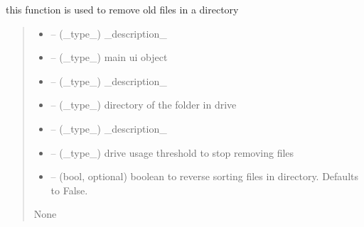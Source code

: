 \documentclass[letterpaper,10pt,english]{sphinxmanual}
\begin{document}
\begin{savenotes}\begin{fulllineitems}
\label{\detokenize{setting/backend/storage_funcs:oxin.backend.storage_funcs.remove_old_files_in_directory}}
\pysigstartsignatures
{}
\pysigstopsignatures
\sphinxAtStartPar
this function is used to remove old files in a directory
\begin{quote}\begin{description}
\begin{itemize}
\item {} 
\sphinxAtStartPar
{} – (\_type\_) \_description\_

\item {} 
\sphinxAtStartPar
{} – (\_type\_) main ui object

\item {} 
\sphinxAtStartPar
{} – (\_type\_) \_description\_

\item {} 
\sphinxAtStartPar
{} – (\_type\_) directory of the folder in drive

\item {} 
\sphinxAtStartPar
{} – (\_type\_) \_description\_

\item {} 
\sphinxAtStartPar
{} – (\_type\_) drive usage threshold to stop removing files

\item {} 
\sphinxAtStartPar
{} – (bool, optional) boolean to reverse sorting files in directory. Defaults to False.

\end{itemize}

\sphinxAtStartPar
None

\end{description}\end{quote}

\end{fulllineitems}\end{savenotes}
\end{document}
